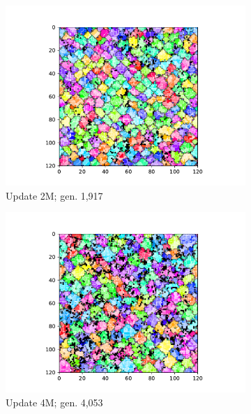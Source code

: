 \begin{figure}[!htbp]
\begin{center}
\begin{subfigure}[b]{0.5\columnwidth}
  \includegraphics[width=\columnwidth,trim={2.5cm 0.5cm 2.5cm 1cm},clip]{img/ChannelMap_1011_update2000000}
  \caption{Update 2M; gen. 1,917}
  \label{fig:ChannelMap_1011_update2000000}
\end{subfigure}%
\begin{subfigure}[b]{0.5\columnwidth}
  \includegraphics[width=\columnwidth,trim={2.5cm 0.5cm 2.5cm 1cm},clip]{img/ChannelMap_1011_update4000000}
  \caption{Update 4M; gen. 4,053}
  \label{fig:ChannelMap_1011_update4000000}
\end{subfigure}
\begin{subfigure}[b]{0.5\columnwidth}

\end{subfigure}
\end{center}
\end{figure}
